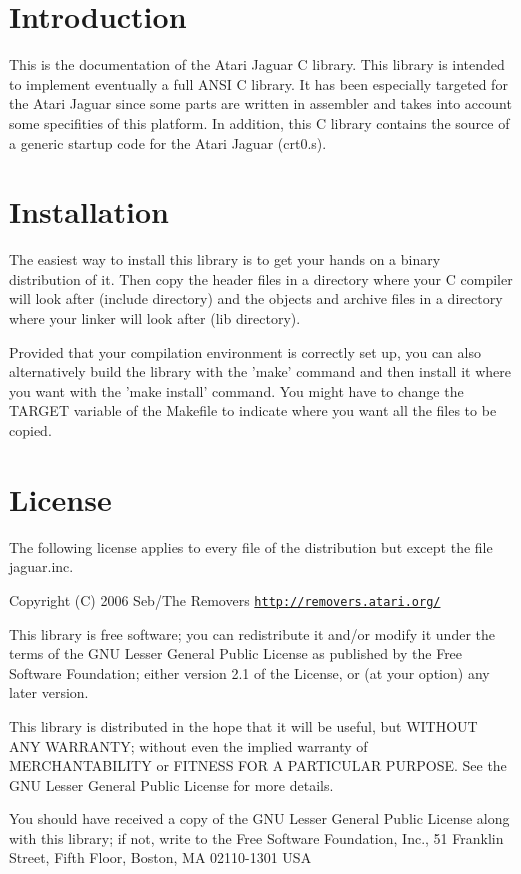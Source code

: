 \hypertarget{index_intro_sec}{}\section{Introduction}\label{index_intro_sec}
This is the documentation of the Atari Jaguar C library. This library is intended to implement eventually a full ANSI C library. It has been especially targeted for the Atari Jaguar since some parts are written in assembler and takes into account some specifities of this platform. In addition, this C library contains the source of a generic startup code for the Atari Jaguar (crt0.s).\hypertarget{index_Installation}{}\section{Installation}\label{index_Installation}
The easiest way to install this library is to get your hands on a binary distribution of it. Then copy the header files in a directory where your C compiler will look after (include directory) and the objects and archive files in a directory where your linker will look after (lib directory).

Provided that your compilation environment is correctly set up, you can also alternatively build the library with the 'make' command and then install it where you want with the 'make install' command. You might have to change the TARGET variable of the Makefile to indicate where you want all the files to be copied.\hypertarget{index_license_sec}{}\section{License}\label{index_license_sec}
The following license applies to every file of the distribution but except the file jaguar.inc.

Copyright (C) 2006 Seb/The Removers \href{http://removers.atari.org/}{\tt http://removers.atari.org/}

This library is free software; you can redistribute it and/or modify it under the terms of the GNU Lesser General Public License as published by the Free Software Foundation; either version 2.1 of the License, or (at your option) any later version.

This library is distributed in the hope that it will be useful, but WITHOUT ANY WARRANTY; without even the implied warranty of MERCHANTABILITY or FITNESS FOR A PARTICULAR PURPOSE. See the GNU Lesser General Public License for more details.

You should have received a copy of the GNU Lesser General Public License along with this library; if not, write to the Free Software Foundation, Inc., 51 Franklin Street, Fifth Floor, Boston, MA 02110-1301 USA 